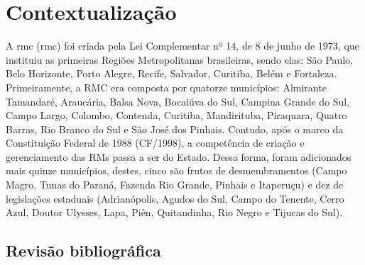 	
	
	\tableofcontents 
	\newpage \listoffigures
	\textual
	
	
	
	
	\chapter{Contextualização}
	
	A \glsdesc{rmc} (\gls{rmc}) foi criada pela Lei Complementar  nº 14, de 8 de junho de 1973, que instituiu as primeiras Regiões Metropolitanas brasileiras, sendo elas: São Paulo, Belo Horizonte, Porto Alegre, Recife, Salvador, Curitiba, Belém e Fortaleza. Primeiramente, a RMC era composta por quatorze municípios: Almirante Tamandaré, Araucária, Balsa Nova, Bocaiúva do Sul, Campina Grande do Sul, Campo Largo, Colombo, Contenda, Curitiba, Mandirituba, Piraquara, Quatro Barras, Rio Branco do Sul e São José dos Pinhais. Contudo, após o marco da Constituição Federal de 1988 (CF/1998), a competência de criação e gerenciamento das RMs passa a ser do Estado. Dessa forma, foram adicionados mais quinze municípios, destes, cinco são frutos de desmembramentos (Campo Magro, Tunas do Paraná, Fazenda Rio Grande, Pinhais e Itaperuçu) e dez de legislações estaduais (Adrianópolis, Agudos do Sul, Campo do Tenente, Cerro Azul, Doutor Ulysses, Lapa, Piên, Quitandinha, Rio Negro e Tijucas do Sul).
	
	\section{Revisão bibliográfica}
	
